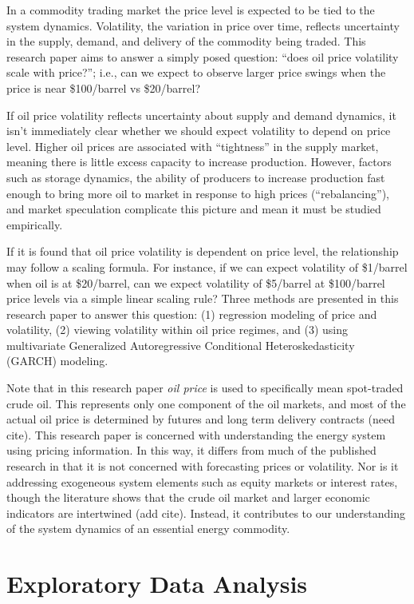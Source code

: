 \documentclass[11pt,]{article}
\begin{document}
In a commodity trading market the price level is expected to be tied to
the system dynamics. Volatility, the variation in price over time,
reflects uncertainty in the supply, demand, and delivery of the
commodity being traded. This research paper aims to answer a simply
posed question: ``does oil price volatility scale with price?''; i.e.,
can we expect to observe larger price swings when the price is near
\$100/barrel vs \$20/barrel?

If oil price volatility reflects uncertainty about supply and demand
dynamics, it isn't immediately clear whether we should expect volatility
to depend on price level. Higher oil prices are associated with
``tightness'' in the supply market, meaning there is little excess
capacity to increase production. However, factors such as storage
dynamics, the ability of producers to increase production fast enough to
bring more oil to market in response to high prices (``rebalancing''),
and market speculation complicate this picture and mean it must be
studied empirically.

If it is found that oil price volatility is dependent on price level,
the relationship may follow a scaling formula. For instance, if we can
expect volatility of \$1/barrel when oil is at \$20/barrel, can we
expect volatility of \$5/barrel at \$100/barrel price levels via a
simple linear scaling rule? Three methods are presented in this research
paper to answer this question: (1) regression modeling of price and
volatility, (2) viewing volatility within oil price regimes, and (3)
using multivariate Generalized Autoregressive Conditional
Heteroskedasticity (GARCH) modeling.

Note that in this research paper \emph{oil price} is used to
specifically mean spot-traded crude oil. This represents only one
component of the oil markets, and most of the actual oil price is
determined by futures and long term delivery contracts (need cite). This
research paper is concerned with understanding the energy system using
pricing information. In this way, it differs from much of the published
research in that it is not concerned with forecasting prices or
volatility. Nor is it addressing exogeneous system elements such as
equity markets or interest rates, though the literature shows that the
crude oil market and larger economic indicators are intertwined (add
cite). Instead, it contributes to our understanding of the system
dynamics of an essential energy commodity.

\section{Exploratory Data Analysis}\label{exploratory-data-analysis}
\end{document}
